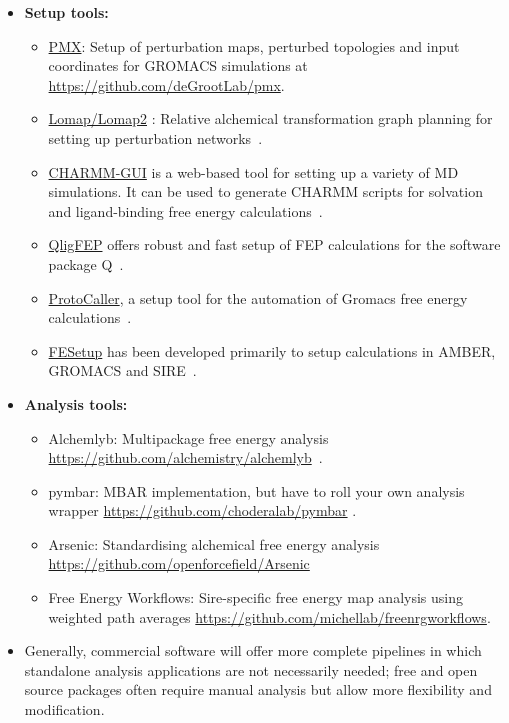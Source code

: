 \documentclass[9pt,bestpractices]{livecoms}
\begin{document}
\begin{itemize}
\item[] \textbf{Setup tools:}
	\begin{itemize}
	\item \href{http://pmx.mpibpc.mpg.de/instructions.html}{PMX}: Setup of perturbation maps, perturbed topologies and input coordinates for GROMACS simulations at \url{https://github.com/deGrootLab/pmx}.
	\item \href{https://github.com/MobleyLab/Lomap}{Lomap/Lomap2} : Relative alchemical transformation graph planning for setting up perturbation networks~\cite{liu2013lead}.
	\item \href{http://www.charmm-gui.org/}{CHARMM-GUI} is a web-based tool for setting up a variety of MD simulations. It can be used to generate CHARMM scripts for solvation and ligand-binding free energy calculations~\cite{jo2008charmmgui}.
	\item \href{https://github.com/qusers/qligfep}{QligFEP} offers robust and fast setup of FEP calculations for the software package Q~\cite{jespers2019qligfep}.
	\item \href{https://github.com/protocaller/ProtoCaller}{ProtoCaller}, a setup tool for the automation of Gromacs free energy calculations~\cite{suruzhon2020protocaller}.
	\item \href{https://fesetup.readthedocs.io/en/latest/introduction.html}{FESetup} has been developed primarily to setup calculations in AMBER, GROMACS and SIRE~\cite{loeffler2015fesetup}.
	\end{itemize}
\item []\textbf{Analysis tools:}
	\begin{itemize}

	\item Alchemlyb: Multipackage free energy analysis
	\url{https://github.com/alchemistry/alchemlyb}~\cite{daviddotson2020alchemistry}.
	\item pymbar: MBAR implementation, but have to roll your own analysis wrapper      
	\url{https://github.com/choderalab/pymbar} \cite{shirts2008statisticallya}.
	\item Arsenic: Standardising alchemical free energy analysis \url{https://github.com/openforcefield/Arsenic}
	\item Free Energy Workflows: Sire-specific free energy map analysis using weighted path averages \url{https://github.com/michellab/freenrgworkflows}.
	\end{itemize}
\item[] Generally, commercial software will offer more complete pipelines in which standalone analysis applications are not necessarily needed; free and open source packages often require manual analysis but allow more flexibility and modification.
\end{itemize}
\end{document}
